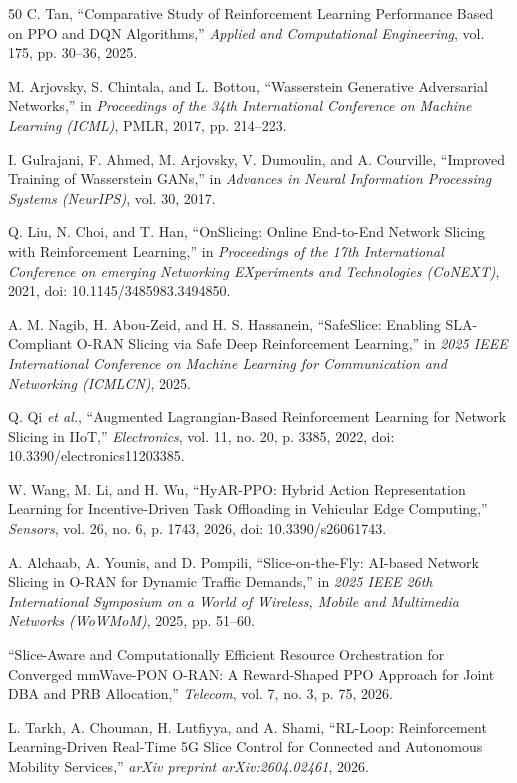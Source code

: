 \documentclass[conference]{IEEEtran}
\begin{document}
\begin{thebibliography}{50}
 C. Tan, ``Comparative Study of Reinforcement Learning Performance Based on PPO and DQN Algorithms,'' \emph{Applied and Computational Engineering}, vol. 175, pp. 30--36, 2025.

 M. Arjovsky, S. Chintala, and L. Bottou, ``Wasserstein Generative Adversarial Networks,'' in \emph{Proceedings of the 34th International Conference on Machine Learning (ICML)}, PMLR, 2017, pp. 214--223.

 I. Gulrajani, F. Ahmed, M. Arjovsky, V. Dumoulin, and A. Courville, ``Improved Training of Wasserstein GANs,'' in \emph{Advances in Neural Information Processing Systems (NeurIPS)}, vol. 30, 2017.

 Q. Liu, N. Choi, and T. Han, ``OnSlicing: Online End-to-End Network Slicing with Reinforcement Learning,'' in \emph{Proceedings of the 17th International Conference on emerging Networking EXperiments and Technologies (CoNEXT)}, 2021, doi: 10.1145/3485983.3494850.

 A. M. Nagib, H. Abou-Zeid, and H. S. Hassanein, ``SafeSlice: Enabling SLA-Compliant O-RAN Slicing via Safe Deep Reinforcement Learning,'' in \emph{2025 IEEE International Conference on Machine Learning for Communication and Networking (ICMLCN)}, 2025.

 Q. Qi \emph{et al.}, ``Augmented Lagrangian-Based Reinforcement Learning for Network Slicing in IIoT,'' \emph{Electronics}, vol. 11, no. 20, p. 3385, 2022, doi: 10.3390/electronics11203385.

 W. Wang, M. Li, and H. Wu, ``HyAR-PPO: Hybrid Action Representation Learning for Incentive-Driven Task Offloading in Vehicular Edge Computing,'' \emph{Sensors}, vol. 26, no. 6, p. 1743, 2026, doi: 10.3390/s26061743.

 A. Alchaab, A. Younis, and D. Pompili, ``Slice-on-the-Fly: AI-based Network Slicing in O-RAN for Dynamic Traffic Demands,'' in \emph{2025 IEEE 26th International Symposium on a World of Wireless, Mobile and Multimedia Networks (WoWMoM)}, 2025, pp. 51--60.

 ``Slice-Aware and Computationally Efficient Resource Orchestration for Converged mmWave-PON O-RAN: A Reward-Shaped PPO Approach for Joint DBA and PRB Allocation,'' \emph{Telecom}, vol. 7, no. 3, p. 75, 2026.

 L. Tarkh, A. Chouman, H. Lutfiyya, and A. Shami, ``RL-Loop: Reinforcement Learning-Driven Real-Time 5G Slice Control for Connected and Autonomous Mobility Services,'' \emph{arXiv preprint arXiv:2604.02461}, 2026.


\end{thebibliography}
\end{document}
